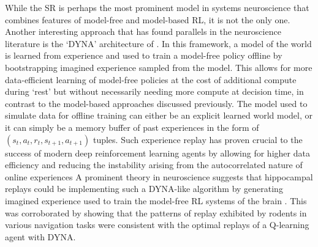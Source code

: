 While the SR is perhaps the most prominent model in systems neuroscience that combines features of model-free and model-based RL, it is not the only one.
Another interesting approach that has found parallels in the neuroscience literature is the `DYNA' architecture of \citet{sutton1991dyna}.
In this framework, a model of the world is learned from experience and used to train a model-free policy offline by bootstrapping imagined experience sampled from the model.
This allows for more data-efficient learning of model-free policies at the cost of additional compute during `rest' but without necessarily needing more compute at decision time, in contrast to the model-based approaches discussed previously.
The model used to simulate data for offline training can either be an explicit learned world model, or it can simply be a memory buffer of past experiences in the form of $(s_t, a_t, r_t, s_{t+1}, a_{t+1})$ tuples.
Such experience replay has proven crucial to the success of modern deep reinforcement learning agents by allowing for higher data efficiency and reducing the instability arising from the autocorrelated nature of online experiences \citep{mnih2013playing,schaul2015prioritized}
A prominent theory in neuroscience suggests that hippocampal replays could be implementing such a DYNA-like algorithm by generating imagined experience used to train the model-free RL systems of the brain \citep{mattar2018prioritized}.
This was corroborated by showing that the patterns of replay exhibited by rodents in various navigation tasks were consistent with the optimal replays of a Q-learning agent with DYNA.
